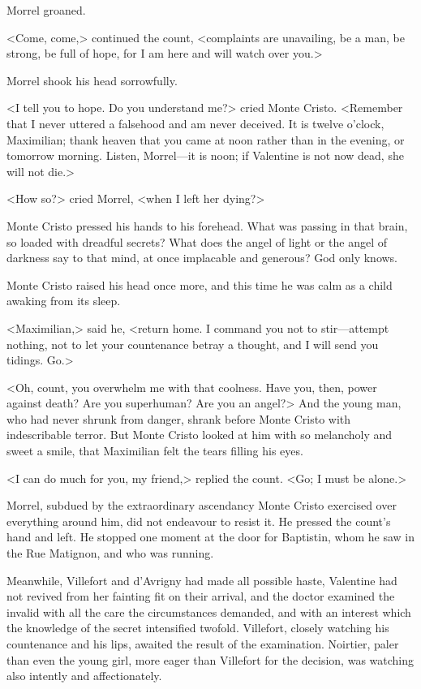  Morrel groaned. 

 <Come, come,> continued the count, <complaints are unavailing, be a man, be strong, be full of hope, for I am here and will watch over you.> 

 Morrel shook his head sorrowfully. 

 <I tell you to hope. Do you understand me?> cried Monte Cristo. <Remember that I never uttered a falsehood and am never deceived. It is twelve o'clock, Maximilian; thank heaven that you came at noon rather than in the evening, or tomorrow morning. Listen, Morrel—it is noon; if Valentine is not now dead, she will not die.> 

 <How so?> cried Morrel, <when I left her dying?> 

 Monte Cristo pressed his hands to his forehead. What was passing in that brain, so loaded with dreadful secrets? What does the angel of light or the angel of darkness say to that mind, at once implacable and generous? God only knows. 

 Monte Cristo raised his head once more, and this time he was calm as a child awaking from its sleep. 

 <Maximilian,> said he, <return home. I command you not to stir—attempt nothing, not to let your countenance betray a thought, and I will send you tidings. Go.> 

 <Oh, count, you overwhelm me with that coolness. Have you, then, power against death? Are you superhuman? Are you an angel?> And the young man, who had never shrunk from danger, shrank before Monte Cristo with indescribable terror. But Monte Cristo looked at him with so melancholy and sweet a smile, that Maximilian felt the tears filling his eyes. 

 <I can do much for you, my friend,> replied the count. <Go; I must be alone.> 

 Morrel, subdued by the extraordinary ascendancy Monte Cristo exercised over everything around him, did not endeavour to resist it. He pressed the count's hand and left. He stopped one moment at the door for Baptistin, whom he saw in the Rue Matignon, and who was running. 

 Meanwhile, Villefort and d'Avrigny had made all possible haste, Valentine had not revived from her fainting fit on their arrival, and the doctor examined the invalid with all the care the circumstances demanded, and with an interest which the knowledge of the secret intensified twofold. Villefort, closely watching his countenance and his lips, awaited the result of the examination. Noirtier, paler than even the young girl, more eager than Villefort for the decision, was watching also intently and affectionately. 


